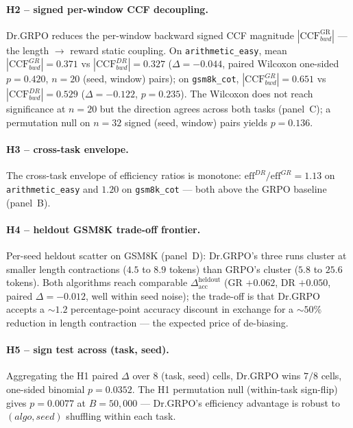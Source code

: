 \paragraph{H2 -- signed per-window CCF decoupling.}
Dr.GRPO reduces the per-window backward signed CCF magnitude
$|\mathrm{CCF}^{\mathrm{GR}}_{bwd}|$ --- the length $\to$ reward
static coupling.  On \texttt{arithmetic\_easy}, mean
$|\mathrm{CCF}^{GR}_{bwd}|=0.371$ vs $|\mathrm{CCF}^{DR}_{bwd}|=0.327$
($\Delta = -0.044$, paired Wilcoxon one-sided $p = 0.420$,
$n{=}20$ (seed, window) pairs); on \texttt{gsm8k\_cot},
$|\mathrm{CCF}^{GR}_{bwd}|=0.651$ vs $|\mathrm{CCF}^{DR}_{bwd}|=0.529$
($\Delta = -0.122$, $p = 0.235$).  The Wilcoxon does not reach
significance at $n{=}20$ but the direction agrees across both tasks
(panel~C); a permutation null on $n{=}32$ signed (seed, window) pairs yields
$p = 0.136$.

\paragraph{H3 -- cross-task envelope.}
The cross-task envelope of efficiency ratios is monotone: $\mathrm{eff}^{DR}/\mathrm{eff}^{GR} = 1.13$
on \texttt{arithmetic\_easy} and $1.20$ on \texttt{gsm8k\_cot} ---
both above the GRPO baseline (panel~B).

\paragraph{H4 -- heldout GSM8K trade-off frontier.}
Per-seed heldout scatter on GSM8K (panel~D): Dr.GRPO's three runs
cluster at smaller length contractions ($4.5$ to $8.9$ tokens) than GRPO's
cluster ($5.8$ to $25.6$ tokens).  Both algorithms reach comparable
$\Delta_{\mathrm{acc}}^{\mathrm{heldout}}$ (GR $+0.062$, DR $+0.050$,
paired $\Delta = -0.012$, well within seed noise); the trade-off is
that Dr.GRPO accepts a $\sim 1.2$ percentage-point accuracy
discount in exchange for a $\sim 50\%$ reduction in length
contraction --- the expected price of de-biasing.

\paragraph{H5 -- sign test across (task, seed).}
Aggregating the H1 paired $\Delta$ over 8 (task, seed) cells,
Dr.GRPO wins $7/8$ cells, one-sided binomial $p = 0.0352$.
The H1 permutation null (within-task sign-flip) gives
$p = 0.0077$ at $B{=}50{,}000$ --- Dr.GRPO's efficiency advantage is
robust to $(algo, seed)$ shuffling within each task.

